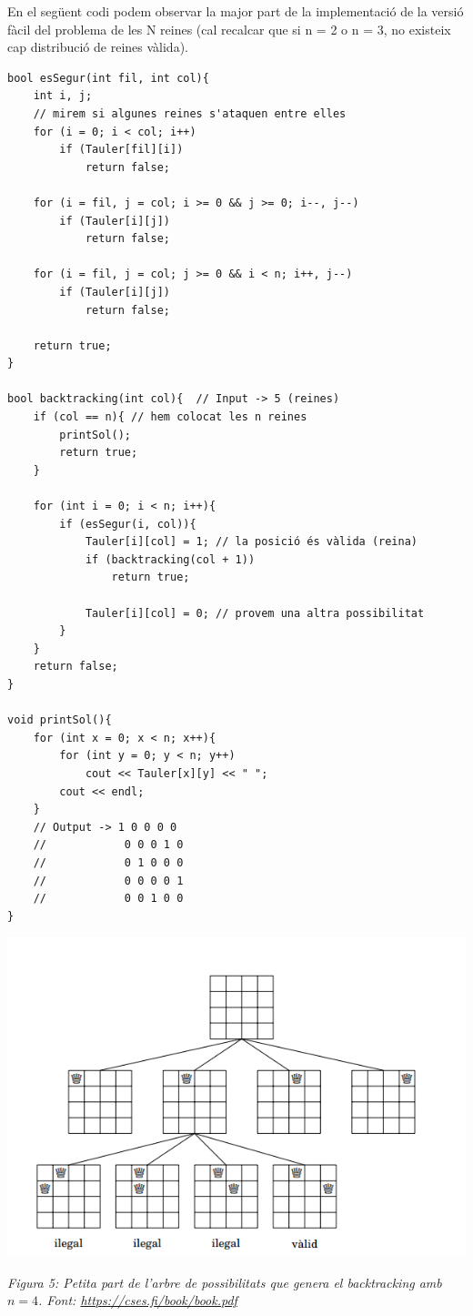 En el següent codi podem observar la major part de la implementació de la versió fàcil del problema de les N reines (cal recalcar que si n = 2 o n = 3, no existeix cap distribució de reines vàlida).
\newpage


\begin{lstlisting}
bool esSegur(int fil, int col){
    int i, j;
    // mirem si algunes reines s'ataquen entre elles
    for (i = 0; i < col; i++)
        if (Tauler[fil][i])
            return false;
 
    for (i = fil, j = col; i >= 0 && j >= 0; i--, j--)
        if (Tauler[i][j])
            return false;
 
    for (i = fil, j = col; j >= 0 && i < n; i++, j--)
        if (Tauler[i][j])
            return false;
 
    return true;
}

bool backtracking(int col){  // Input -> 5 (reines)
    if (col == n){ // hem colocat les n reines
        printSol();
        return true;  
    }      

    for (int i = 0; i < n; i++){
        if (esSegur(i, col)){
            Tauler[i][col] = 1; // la posició és vàlida (reina) 
            if (backtracking(col + 1))
                return true;
            
            Tauler[i][col] = 0; // provem una altra possibilitat
        }
    }   
    return false;
}

void printSol(){
    for (int x = 0; x < n; x++){
        for (int y = 0; y < n; y++)
            cout << Tauler[x][y] << " ";
        cout << endl;
    }
    // Output -> 1 0 0 0 0 
    //            0 0 0 1 0 
    //            0 1 0 0 0 
    //            0 0 0 0 1 
    //            0 0 1 0 0 
}
\end{lstlisting}



\begin{center}
    \includegraphics[width=.8 \textwidth]{back.png}
    
    \caption{\emph{Figura 5: Petita part de l'arbre de possibilitats que genera el backtracking amb $n = 4$. Font: \url{https://cses.fi/book/book.pdf}}}
\end{center}



